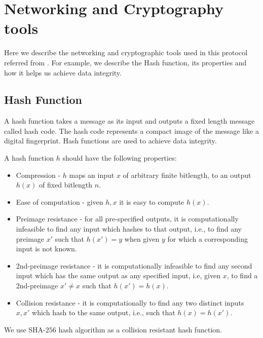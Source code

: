 \chapter{Networking and Cryptography tools} %
\label{cha:Networking and Cryptography tools}
	Here we describe the networking and cryptographic tools used in this protocol referred from \cite{menezes2010handbook,stinson2005cryptography}.
	For example, we describe the Hash function, its properties and how it helps us achieve data integrity.

\section{Hash Function}
	A hash function takes a message as its input and outputs a fixed length message called hash code.
	The hash code represents a compact image of the message like a digital fingerprint.
	Hash functions are used to achieve data integrity.

	A hash function $h$ should have the following properties:
	\begin{itemize}
		\item Compression - $h$ maps an input $x$ of arbitrary finite bitlength, to an output $h(x)$ of fixed bitlength $n$.
		\item Ease of computation - given $h,x$ it is easy to compute $h(x)$.
		\item Preimage resistance - for all pre-specified outputs, it is computationally infeasible to find any input which hashes to that output, i.e., to find any preimage $x'$ such that $h(x') = y$ when given $y$ for which a corresponding input is not known.
		\item 2nd-preimage resistance - it is computationally infeasible to find any second input which has the same output as any specified input, i.e, given $x$, to find a 2nd-preimage $x' \neq x$ such that $h(x') = h(x)$.
		\item Collision resistance - it is computationally to find any two distinct inputs $x,x'$ which hash to the same output, i.e., such that $h(x) = h(x')$.
	\end{itemize} 

	We use SHA-$256$\cite{SHA256} hash algorithm as a collision resistant hash function.

